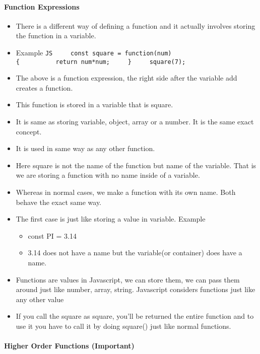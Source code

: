 \documentclass[
  paper=a4,
  ,captions=tableheading
]{scrartcl}
\providecommand{\tightlist}{%
  \setlength{\itemsep}{0pt}\setlength{\parskip}{0pt}}
\begin{document}
\hypertarget{function-expressions}{%
\paragraph{Function Expressions}\label{function-expressions}}

\begin{itemize}
\tightlist
\item
  There is a different way of defining a function and it actually
  involves storing the function in a variable.
\item
  Example
  \texttt{JS\ \ \ \ \ const\ square\ =\ function(num)\{\ \ \ \ \ \ \ \ \ \ return\ num*num;\ \ \ \ \ \}\ \ \ \ \ square(7);}
\item
  The above is a function expression, the right side after the variable
  add creates a function.
\item
  This function is stored in a variable that is square.
\item
  It is same as storing variable, object, array or a number. It is the
  same exact concept.
\item
  It is used in same way as any other function.
\item
  Here square is not the name of the function but name of the variable.
  That is we are storing a function with no name inside of a variable.
\item
  Whereas in normal cases, we make a function with its own name. Both
  behave the exact same way.
\item
  The first case is just like storing a value in variable. Example

  \begin{itemize}
  \tightlist
  \item
    const PI = 3.14
  \item
    3.14 does not have a name but the variable(or container) does have a
    name.
  \end{itemize}
\item
  Functions are values in Javascript, we can store them, we can pass
  them around just like number, array, string. Javascript considers
  functions just like any other value
\item
  If you call the square as square, you'll be returned the entire
  function and to use it you have to call it by doing square() just like
  normal functions.
\end{itemize}

\hypertarget{higher-order-functions-important}{%
\paragraph{Higher Order Functions
(Important)}\label{higher-order-functions-important}}
\end{document}
